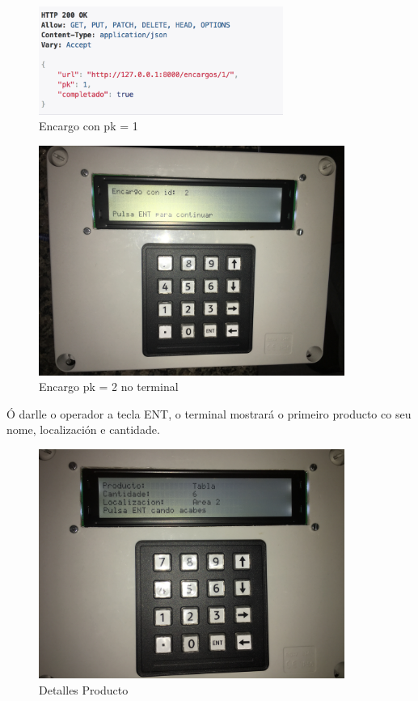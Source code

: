 \documentclass[11pt,twoside]{book}
\begin{document}
\begin{figure}[H]
	\begin{center}
		\includegraphics[width=8cm]{images/encargo_1.png}
	\end{center}
	\caption{Encargo con pk = 1}
	\label{fig:Encargo1}
\end{figure}

\begin{figure}[H]
	\begin{center}
		\includegraphics[width=10cm]{images/id_encargo.JPG}
	\end{center}
	\caption{Encargo pk = 2 no terminal}
	\label{fig:Encargo1}
\end{figure}

Ó darlle o operador a tecla ENT, o terminal mostrará o primeiro producto co seu nome, localización e cantidade. 

\begin{figure}[H]
	\begin{center}
		\includegraphics[width=10cm]{images/detalles_producto.JPG}
	\end{center}
	\caption{Detalles Producto}
	\label{fig:Encargo1}
\end{figure}
\end{document}
